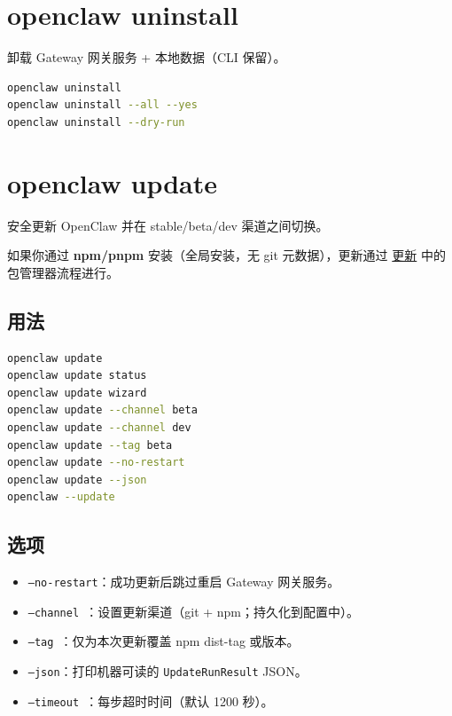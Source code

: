 \clearpage

\section{openclaw uninstall}


卸载 Gateway 网关服务 + 本地数据（CLI 保留）。

\begin{lstlisting}[language=bash]
openclaw uninstall
openclaw uninstall --all --yes
openclaw uninstall --dry-run
\end{lstlisting}



\clearpage

\section{openclaw update}


安全更新 OpenClaw 并在 stable/beta/dev 渠道之间切换。

如果你通过 \textbf{npm/pnpm} 安装（全局安装，无 git 元数据），更新通过 \href{/install/updating}{更新} 中的包管理器流程进行。

\subsection{用法}


\begin{lstlisting}[language=bash]
openclaw update
openclaw update status
openclaw update wizard
openclaw update --channel beta
openclaw update --channel dev
openclaw update --tag beta
openclaw update --no-restart
openclaw update --json
openclaw --update
\end{lstlisting}


\subsection{选项}


\begin{itemize}
  \item \texttt{--no-restart}：成功更新后跳过重启 Gateway 网关服务。
  \item \texttt{--channel }：设置更新渠道（git + npm；持久化到配置中）。
  \item \texttt{--tag }：仅为本次更新覆盖 npm dist-tag 或版本。
  \item \texttt{--json}：打印机器可读的 \texttt{UpdateRunResult} JSON。
  \item \texttt{--timeout }：每步超时时间（默认 1200 秒）。
\end{itemize}


